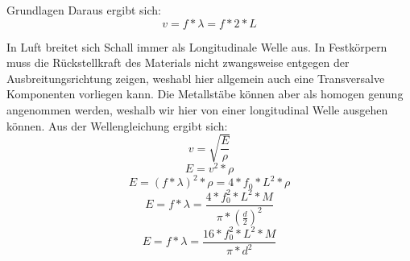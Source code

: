 \documentclass[twoside]{protokoll}
\begin{document}
\begin{aufgabe}{Grundlagen}
    Daraus ergibt sich:
    \begin{equation}
        v = f * \lambda = f * 2 * L
    \end{equation}

    In Luft breitet sich Schall immer als Longitudinale Welle aus.
    In Festkörpern muss die Rückstellkraft des Materials nicht zwangsweise entgegen der Ausbreitungsrichtung zeigen, weshabl hier allgemein auch eine Transversalve Komponenten vorliegen kann.
    Die Metallstäbe können aber als homogen genung angenommen werden, weshalb wir hier von einer longitudinal Welle ausgehen können.
    Aus der Wellengleichung ergibt sich:
    \begin{equation}
         v = \sqrt{\frac{E}{\rho}}
    \end{equation}
    \begin{equation}
         E = v ^2 * \rho
    \end{equation}
    \begin{equation}
        E = (f * \lambda)^2 * \rho = 4 * f_0 * L ^2 * \rho
    \end{equation}
    \begin{equation}
        E = f * \lambda = \frac{ 4 * f_0^2 * L ^2 * M}{\pi * (\frac{d}{2}) ^2}
    \end{equation}
    \begin{equation}
        E = f * \lambda = \frac{ 16 * f_0^2 * L ^2 * M}{\pi * d ^2}
    \end{equation}

     
\end{aufgabe}
\end{document}
